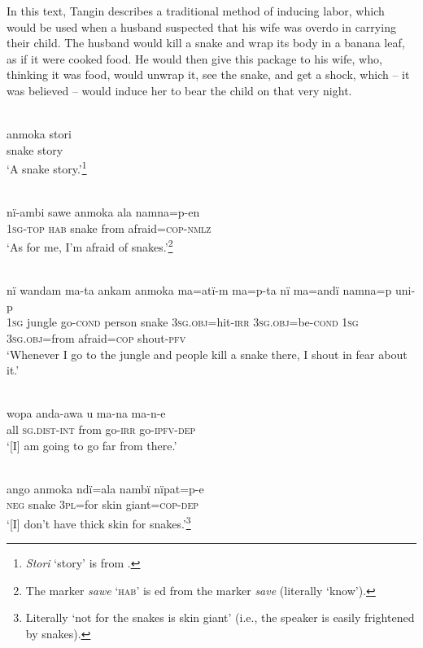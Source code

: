   In this text, Tangin describes a traditional method of inducing labor, which would be used when a husband suspected that his wife was overdo in carrying their child. The husband would kill a snake and wrap its body in a banana leaf, as if it were cooked food. He would then give this package to his wife, who, thinking it was food, would unwrap it, see the snake, and get a shock, which -- it was believed -- would induce her to bear the child on that very night.

\setcounter{equation}{0}
\\
\gll anmoka  stori\\
snake    story\\
\glt ‘A snake story.’\footnote{\textit{Stori} ‘story’ is from .}

\\
\gll nï-ambi  sawe  anmoka  ala  namna=p-en\\
1\textsc{sg-top}  \textsc{hab}  snake    from  afraid=\textsc{cop}{}-\textsc{nmlz}\\
\glt ‘As for me, I’m afraid of snakes.’\footnote{The  marker \textit{sawe} ‘\textsc{hab}’ is ed from the   marker \textit{save} (literally ‘know’).}

\\
\gll nï    wandam  ma-ta    ankam  anmoka  ma=atï-m ma=p-ta      nï    ma=andï    namna=p    uni-p\\
1\textsc{sg}  jungle    go-\textsc{cond}  person  snake    3\textsc{sg.obj}=hit-\textsc{irr} \textsc{3sg.obj=}be\textsc{{}-cond} 1\textsc{sg}  3\textsc{sg.obj}=from  afraid=\textsc{cop}  shout-\textsc{pfv}\\
\glt ‘Whenever I go to the jungle and people kill a snake there, I shout in fear about it.’

\\
\gll wopa  anda-awa    u    ma-na  ma-n-e\\
all    \textsc{sg.dist-int}  from  go-\textsc{irr}  go-\textsc{ipfv-dep}\\
\glt ‘[I] am going to go far from there.’

\\
\gll ango  anmoka  ndï=ala  nambï  nïpat=p-e\\
\textsc{neg}  snake    3\textsc{pl}=for  skin  giant=\textsc{cop}{}-\textsc{dep}\\
\glt ‘[I] don’t have thick skin for snakes.’\footnote{Literally ‘not for the snakes is skin giant’ (i.e., the speaker is easily frightened by snakes).}

